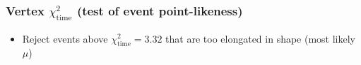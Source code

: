 \documentclass[14pt]{beamer}
\begin{document}
\begin{frame}
	\frametitle{Vertex $\chi^{2}_{\mathrm{time}}$ (test of event point-likeness)}
	\centering
	\begin{itemize}
		\item<2-> Reject events above $\chi_{\text{time}}^2 = 3.32$ that are too
			elongated in shape (most likely $\mu$)
	\end{itemize}
\end{frame}
\end{document}
